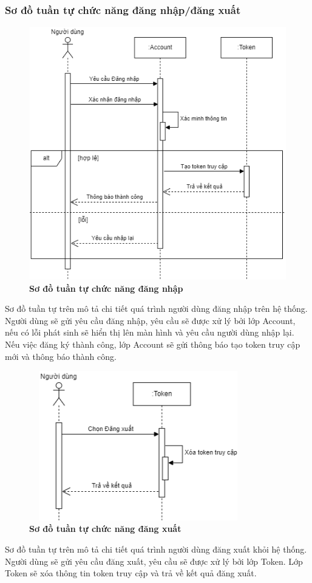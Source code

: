 \subsubsection{Sơ đồ tuần tự chức năng đăng nhập/đăng xuất}
\begin{figure}[H]
  \centering
  \includegraphics[width=12cm,height=11cm]{Images/sequence/sequence_login.png}
  \caption[Sơ đồ tuần tự chức năng đăng nhập]{\bfseries \fontsize{12pt}{0pt}
  \selectfont Sơ đồ tuần tự chức năng đăng nhập}
  \label{sequence_login} %
\end{figure}
Sơ đồ tuần tự trên mô tả chi tiết quá trình người dùng đăng nhập trên hệ thống. Người dùng sẽ gửi yêu cầu đăng nhập, yêu cầu sẽ được xử lý
bởi lớp Account, nếu có lỗi phát sinh sẽ hiển thị lên màn hình và yêu cầu người dùng nhập lại. Nếu việc đăng ký thành công, lớp Account sẽ gửi thông báo 
tạo token truy cập mới và thông báo thành công. 
\begin{figure}[H]
  \centering
  \includegraphics[width=9.5cm,height=6.5cm]{Images/sequence/sequence_logout.png}
  \caption[Sơ đồ tuần tự chức năng đăng xuất]{\bfseries \fontsize{12pt}{0pt}
  \selectfont Sơ đồ tuần tự chức năng đăng xuất}
  \label{sequence_logout} %
\end{figure}
Sơ đồ tuần tự trên mô tả chi tiết quá trình người dùng đăng xuất khỏi hệ thống. Người dùng sẽ gửi yêu cầu đăng xuất, yêu cầu sẽ được xử lý
bởi lớp Token. Lớp Token sẽ xóa thông tin token truy cập và trả về kết quả đăng xuất.

